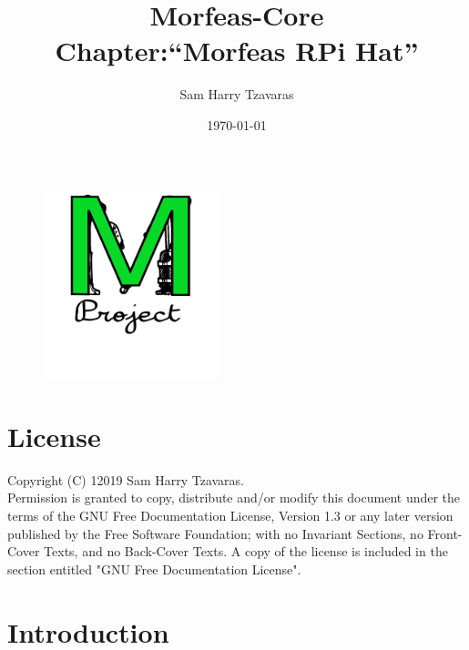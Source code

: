 \documentclass{article}
\title{Morfeas-Core\\Chapter:``Morfeas RPi Hat''}
\date{\today}
\author{Sam Harry Tzavaras}
\begin{document}
\clearpage
\begin{figure}
\centering
  \includegraphics[width=2in]{../../../Docs/Morfeas_project_Documentation/ArtWork/Morfeas_logo_green.png}
\end{figure}
\maketitle
\thispagestyle{empty}
\newpage
\section{License}
Copyright (C)  12019  Sam Harry Tzavaras.\\
Permission is granted to copy, distribute and/or modify this document
under the terms of the GNU Free Documentation License, Version 1.3
or any later version published by the Free Software Foundation;
with no Invariant Sections, no Front-Cover Texts, and no Back-Cover Texts.
A copy of the license is included in the section entitled "GNU Free Documentation License".
\newpage
\newpage
\tableofcontents
\newpage

\section{Introduction}
\end{document}

